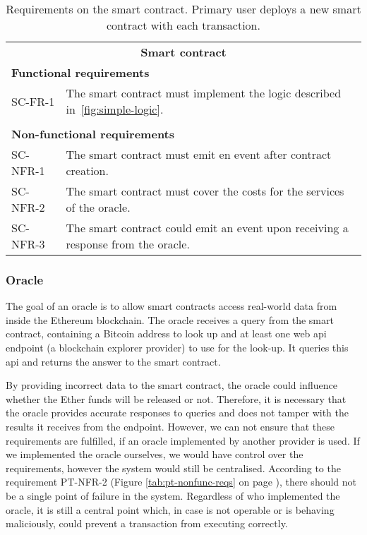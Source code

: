 \begin{table}[ht]
    \centering
    \begin{tabularx}{\textwidth}{|l X|}
    \hline
        \multicolumn{2}{|c|}{\textbf{Smart contract}}\\
        \multicolumn{2}{|l|}{\textbf{Functional requirements}}\\
        SC-FR-1&The smart contract must implement the logic described in~\ref{fig:simple-logic}.\\
        &\\
        \multicolumn{2}{|l|}{\textbf{Non-functional requirements}}\\
        SC-NFR-1&The smart contract must emit en event after contract creation.\\
        SC-NFR-2&The smart contract must cover the costs for the services of the oracle.\\
        SC-NFR-3&The smart contract could emit an event upon receiving a response from the oracle.\\
    \hline
    \end{tabularx}
    \caption{Requirements on the smart contract. Primary user deploys a new smart contract with each transaction.}
    \label{tab:reqs-smart-contract}
\end{table}

\subsubsection{Oracle}
The goal of an oracle is to allow smart contracts access real-world data from inside the Ethereum blockchain. The oracle receives a query from the smart contract, containing a Bitcoin address to look up and at least one web \acrshort{api} endpoint (a blockchain explorer provider) to use for the look-up. It queries this \acrshort{api} and returns the answer to the smart contract.

By providing incorrect data to the smart contract, the oracle could influence whether the Ether funds will be released or not. Therefore, it is necessary that the oracle provides accurate responses to queries and does not tamper with the results it receives from the endpoint. However, we can not ensure that these requirements are fulfilled, if an oracle implemented by another provider is used. If we implemented the oracle ourselves, we would have control over the requirements, however the system would still be centralised. According to the requirement PT-NFR-2 (Figure \ref{tab:pt-nonfunc-reqs} on page \pageref{tab:pt-nonfunc-reqs}), there should not be a single point of failure in the system. Regardless of who implemented the oracle, it is still a central point which, in case is not operable or is behaving maliciously, could prevent a transaction from executing correctly.

